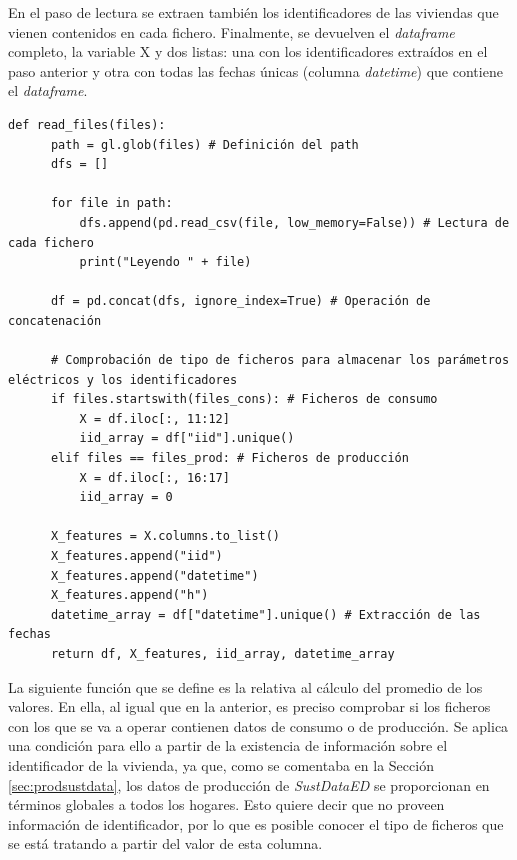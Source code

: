 En el paso de lectura se extraen también los identificadores de las viviendas que vienen contenidos en cada fichero. Finalmente, se devuelven el \textit{dataframe} completo, la variable X y dos listas: una con los identificadores extraídos en el paso anterior y otra con todas las fechas únicas (columna \textit{datetime}) que contiene el \textit{dataframe}.

\vspace{3mm}

\begin{lstlisting}[style=Python, caption={Función de lectura de los ficheros}]
  def read_files(files):
      path = gl.glob(files) # Definición del path
      dfs = []

      for file in path:
          dfs.append(pd.read_csv(file, low_memory=False)) # Lectura de cada fichero
          print("Leyendo " + file)

      df = pd.concat(dfs, ignore_index=True) # Operación de concatenación

      # Comprobación de tipo de ficheros para almacenar los parámetros eléctricos y los identificadores
      if files.startswith(files_cons): # Ficheros de consumo
          X = df.iloc[:, 11:12]
          iid_array = df["iid"].unique()
      elif files == files_prod: # Ficheros de producción
          X = df.iloc[:, 16:17]
          iid_array = 0

      X_features = X.columns.to_list()
      X_features.append("iid")
      X_features.append("datetime")
      X_features.append("h")
      datetime_array = df["datetime"].unique() # Extracción de las fechas
      return df, X_features, iid_array, datetime_array
\end{lstlisting}

\vspace{3mm}

La siguiente función que se define es la relativa al cálculo del promedio de los valores. En ella, al igual que en la anterior, es preciso comprobar si los ficheros con los que se va a operar contienen datos de consumo o de producción. Se aplica una condición para ello a partir de la existencia de información sobre el identificador de la vivienda, ya que, como se comentaba en la Sección \ref{sec:prodsustdata}, los datos de producción de \textit{SustDataED} se proporcionan en términos globales a todos los hogares. Esto quiere decir que no proveen información de identificador, por lo que es posible conocer el tipo de ficheros que se está tratando a partir del valor de esta columna.

